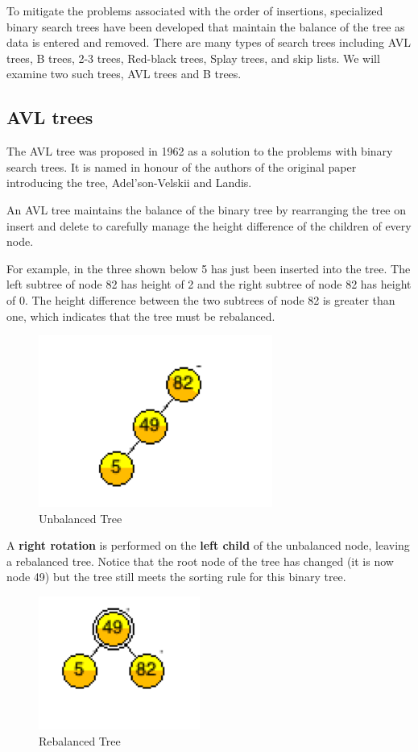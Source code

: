 To mitigate the problems associated with the order of insertions, specialized binary search trees have been developed that maintain the balance of the tree as data is entered and removed. There are many types of search trees including AVL trees, B trees, 2-3 trees, Red-black trees, Splay trees, and  skip lists. We will examine two such trees, AVL trees and B trees.


\subsection{AVL trees}

The AVL tree was proposed in 1962 as a solution to the problems with binary search trees. It is named in honour of the authors of the original paper introducing the tree, Adel'son-Velskii and Landis.

An AVL tree maintains the balance of the binary tree by rearranging the tree on insert and delete to carefully manage the height difference of the children of every node.

For example, in the three shown below 5 has just been inserted into the tree. The left subtree of node 82 has height of 2 and the right subtree of node 82 has height of 0. The height difference between the two subtrees of node 82 is greater than one, which indicates that the tree must be rebalanced.

\begin{figure}[H]
\centering
\includegraphics{pictures/tree1.png}
\caption{Unbalanced Tree}
\label{fig:tree1}
\end{figure}

A \textbf{right rotation} is performed on the \textbf{left child} of the unbalanced node, leaving a rebalanced tree. Notice that the root node of the tree has changed (it is now node 49) but the tree still meets the sorting rule for this binary tree.

\begin{figure}[H]
\centering
\includegraphics{pictures/tree2.png}
\caption{Rebalanced Tree}
\label{fig:tree2}
\end{figure}

